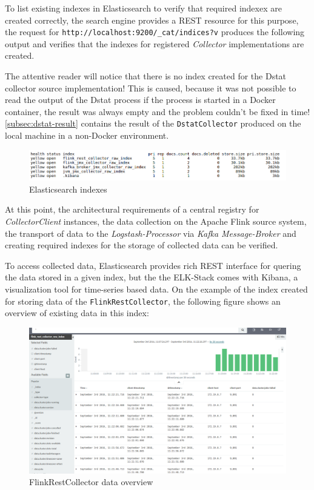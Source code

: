 To list existing indexes in Elasticsearch to verify that required indexex are created correctly, the search engine provides a
REST resource for this purpose, the request for \verb|http://localhost:9200/_cat/indices?v| produces the following output and verifies
that the indexes for registered \textit{Collector} implementations are created.

The attentive reader will notice that there is no index created for the Dstat collector source implementation! This is caused, because
it was not possible to read the output of the Dstat process if the process is started in a Docker container, the result was always empty
and the problem couldn't be fixed in time! \autoref{subsec:dstat-result} contains the result of the \verb|DstatCollector| produced
on the local machine in a non-Docker environment.
\begin{figure}[H]
	\centering
	\includegraphics[width=1.0\textwidth]{../images/12-indexes.png}
	\caption{Elasticsearch indexes}
	\label{fig:indexes}
\end{figure}

At this point, the architectural requirements of a central registry for \textit{CollectorClient} instances, the data collection on the
Apache Flink source system, the transport of data to the \textit{Logstash-Processor} via \textit{Kafka Message-Broker} and creating required
indexes for the storage of collected data can be verified.

To access collected data, Elasticsearch provides rich REST interface for quering the data stored in a given index, but the the ELK-Stack
comes with Kibana, a visualization tool for time-series based data. On the example of the index created for storing data of the
\verb|FlinkRestCollector|, the following figure shows an overview of existing data in this index:
\begin{figure}[H]
	\centering
	\includegraphics[width=1.0\textwidth]{../images/13-kibana.png}
	\caption{FlinkRestCollector data overview}
	\label{fig:kibana}
\end{figure}

